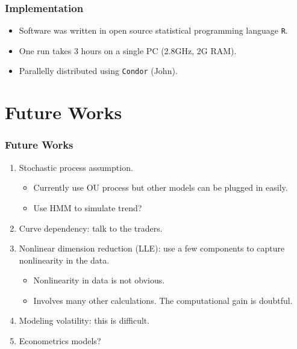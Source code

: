 \documentclass[10pt]{beamer}
\begin{document}


\frame
{
  \frametitle{Implementation}
\begin{itemize}
\item Software was written in open source statistical 
programming language {\tt R}.
\item One run takes 3 hours on a single PC (2.8GHz, 2G RAM).
\item Parallelly distributed using {\tt Condor} (John).
\end{itemize}
}


\section{Future Works}

\frame
{
  \frametitle{Future Works}
\begin{enumerate}
\item Stochastic process assumption.
\begin{itemize}
\item Currently use OU process but 
other models can be plugged in easily.
\item Use HMM to simulate trend?
\end{itemize}
\item Curve dependency: talk to the traders.

\item Nonlinear dimension reduction (LLE): use a few
components to capture nonlinearity in the data.
\begin{itemize} 
\item Nonlinearity in data is not obvious.
\item Involves many other calculations. 
The computational gain is doubtful.
\end{itemize}

\item Modeling volatility: this is difficult.
\item Econometrics models? 
\end{enumerate}

}
\end{document}
